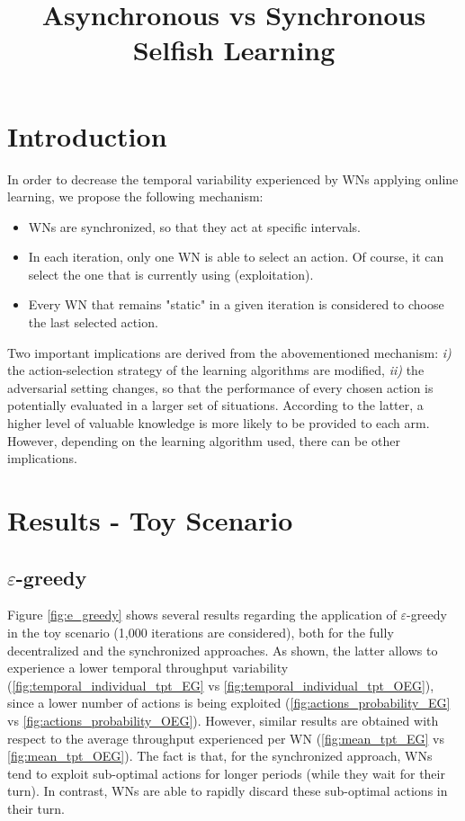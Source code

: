 \documentclass[preprint,12pt]{article}
\title{Asynchronous vs Synchronous Selfish Learning}
\begin{document}
\maketitle

\section{Introduction}
In order to decrease the temporal variability experienced by WNs applying online learning, we propose the following mechanism:
\begin{itemize}
	\item WNs are synchronized, so that they act at specific intervals.
	\item In each iteration, only one WN is able to select an action. Of course, it can select the one that is currently using (exploitation).
	\item Every WN that remains "static" in a given iteration is considered to choose the last selected action.
\end{itemize}

Two important implications are derived from the abovementioned mechanism: \emph{i)} the action-selection strategy of the learning algorithms are modified, \emph{ii)} the adversarial setting changes, so that the performance of every chosen action is potentially evaluated in a larger set of situations. According to the latter, a higher level of valuable knowledge is more likely to be provided to each arm. However, depending on the learning algorithm used, there can be other implications.
 
\section{Results - Toy Scenario}

\subsection{$\varepsilon$-greedy}
\label{section:e-greedy}

Figure \ref{fig:e_greedy} shows several results regarding the application of $\varepsilon$-greedy in the toy scenario (1,000 iterations are considered), both for the fully decentralized and the synchronized approaches. As shown, the latter allows to experience a lower temporal throughput variability (\ref{fig:temporal_individual_tpt_EG} vs \ref{fig:temporal_individual_tpt_OEG}), since a lower number of actions is being exploited (\ref{fig:actions_probability_EG} vs \ref{fig:actions_probability_OEG}). However, similar results are obtained with respect to the average throughput experienced per WN (\ref{fig:mean_tpt_EG} vs \ref{fig:mean_tpt_OEG}). The fact is that, for the synchronized approach, WNs tend to exploit sub-optimal actions for longer periods (while they wait for their turn). In contrast, WNs are able to rapidly discard these sub-optimal actions in their turn.
\end{document}
